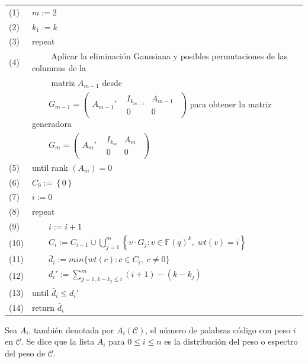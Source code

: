 \begin{tabular}{l l}
    (1) & $m := 2$ \\
    (2) & $k_1 := k$ \\
    (3) & repeat \\
    (4) & $\qquad$ Aplicar la eliminación Gaussiana y posibles permutaciones de las columnas de la\\
        & $\qquad$ matriz $A_{m-1}$ desde \\
        & $\qquad G_{m-1} = \left( \begin{array}{c|c} A_{m-1}' & \begin{array}{c|c} I_{k_{m-1}} & A_{m-1} \\ \hline  0 & 0 \end{array} \end{array} \right)$
        para obtener la matriz generadora \\
        & $\qquad G_{m} = \left( \begin{array}{c|c}  A_{m}' & \begin{array}{c|c}   I_{k_{m}} & A_{m} \\  \hline 0 & 0  \end{array}  \end{array} \right)$\\
    (5) & until rank $(A_m) = 0$ \\
    (6) & $C_0 := \left\lbrace 0 \right\rbrace$\\
    (7) & $i := 0$\\
    (8) & repeat\\
    (9) & $\qquad i := i + 1$\\
    (10) & $\qquad C_i := C_{i-1} \cup \bigcup_{j=1}^m \left\lbrace v \cdot G_j : v \in \mathbb{F}(q)^k, \; wt(v) = i \right\rbrace$\\
    (11) & $\qquad \bar{d}_i := min \lbrace wt(c) : c \in C_i, \; c \neq 0 \rbrace$\\
    (12) & $\qquad d_i' := \sum_{j=1, k-k_j \leq i}^m (i+1)-(k-k_j)$\\
    (13) & until $\bar{d}_i \leq d_i'$\\
    (14) & return $\bar{d}_i$
\end{tabular}

\begin{definition}
    Sea $A_i$, también denotada por $A_i(\mathcal{C})$, el número de palabras código con peso $i$ en $\mathcal{C}$. Se dice que la lista $A_i$ para $0 \leq i \leq n$ es la distribución del peso o espectro del peso de $\mathcal{C}$.
\end{definition}

